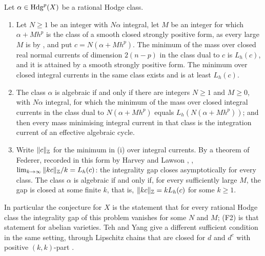 \begin{theorem}\label{thm:massgap}
Let $\alpha\in\mathrm{Hdg}^{p}(X)$ be a rational Hodge class.
\begin{enumerate}[label=\textup{(\roman*)},leftmargin=2.6em,itemsep=2pt]
\item Let $N\ge1$ be an integer with $N\alpha$ integral, let $M$ be an
  integer for which $\alpha+Mh^{p}$ is the class of a smooth closed strongly
  positive form, as every large $M$ is by , and
  put $c=N(\alpha+Mh^{p})$. The minimum of the mass over closed real normal
  currents of dimension $2(n-p)$ in the class dual to $c$ is $L_{h}(c)$, and
  it is attained by a smooth strongly positive form. The minimum over closed
  integral currents in the same class exists and is at least $L_{h}(c)$.
\item The class $\alpha$ is algebraic if and only if there are integers
  $N\ge1$ and $M\ge0$, with $N\alpha$ integral, for which the minimum of the
  mass over closed integral currents in the class dual to $N(\alpha+Mh^{p})$
  equals $L_{h}(N(\alpha+Mh^{p}))$; and then every mass minimising integral
  current in that class is the integration current of an effective algebraic
  cycle.
\item Write $\|c\|_{\mathbb{Z}}$ for the minimum in \textup{(i)} over integral
  currents. By a theorem of Federer, recorded in this form by Harvey and
  Lawson \cite[Section~6]{HL09}, \cite{Fed69,Fed74}, $\lim_{k\to\infty}
  \|kc\|_{\mathbb{Z}}/k=L_{h}(c)$: the integrality gap closes asymptotically for
  every class. The class $\alpha$ is algebraic if and only if, for every
  sufficiently large $M$, the gap is closed at some finite $k$, that is,
  $\|kc\|_{\mathbb{Z}}=kL_{h}(c)$ for some $k\ge1$.
\end{enumerate}
In particular the conjecture for $X$ is the statement that for every rational
Hodge class the integrality gap of this problem vanishes for some $N$ and $M$;
\textup{(F2)} is that statement for abelian varieties. Teh and Yang give a
different sufficient condition in the same setting, through Lipschitz chains
that are closed for $d$ and $d^{c}$ with positive $(k,k)$-part
\cite[Theorem~4.2]{TY21}.
\end{theorem}

